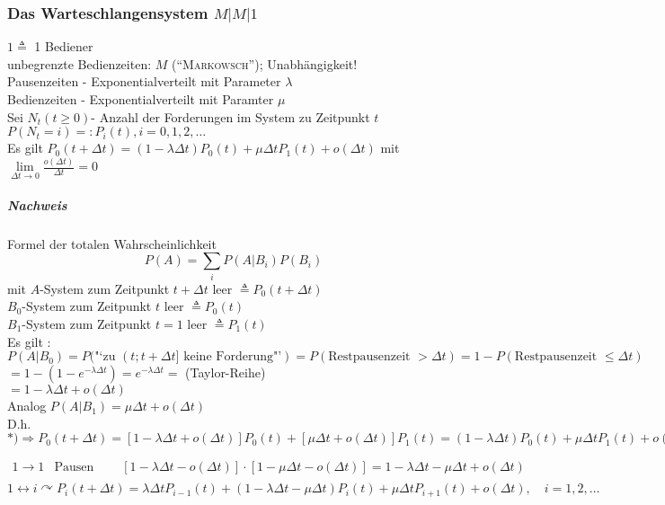 \documentclass[a4paper]{scrartcl}
\begin{document}
\subsubsection{Das Warteschlangensystem $M|M|1$}
$1 \triangleq$ 1 Bediener\\
unbegrenzte Bedienzeiten: $M$ ("`\textsc{Markowsch}"'); Unabhängigkeit!\\
Pausenzeiten - Exponentialverteilt mit Parameter $\lambda$\\
Bedienzeiten - Exponentialverteilt mit Paramter $\mu$\\
Sei $N_t (t \geq 0)$- Anzahl der Forderungen im System zu Zeitpunkt $t$\\
$P(N_t = i) =: P_i(t), i=0,1,2,\dots$\\
Es gilt $P_0 (t + \Delta t) = (1- \lambda \Delta t) P_0(t) + \mu \Delta t P_1(t) + o(\Delta t)$ mit $\lim\limits_{\Delta t \to 0} \frac{o(\Delta t)}{\Delta t} = 0$

\subparagraph{Nachweis} Formel der totalen Wahrscheinlichkeit
\[ P(A) = \sum\limits_i P(A | B_i ) P(B_i)\]
mit $A$-System zum Zeitpunkt $t+ \Delta t$ leer $\triangleq P_0(t+ \Delta t)$\\
$B_0$-System zum Zeitpunkt $t$ leer $\triangleq P_0(t)$\\
$B_1$-System zum Zeitpunkt $t=1$ leer $\triangleq P_1(t)$\\
Es gilt : $P(A | B_0) = P(\text{"`zu } (t; t+ \Delta t] \text{ keine Forderung"'}) = P(\text{Restpausenzeit } > \Delta t) = 1-P(\text{Restpausenzeit } \leq \Delta t)$\\
$= 1-(1-e^{-\lambda \Delta t} ) = e^{-\lambda \Delta t} =$ (Taylor-Reihe)\\
$= 1- \lambda \Delta t + o(\Delta t)$\\
Analog $P(A | B_1) = \mu \Delta t + o(\Delta t)$\\
D.h. $*) \Rightarrow P_0(t + \Delta t) = [ 1-\lambda \Delta t + o(\Delta t)] P_0(t) + [\mu \Delta t + o(\Delta t)] P_1(t) = (1-\lambda \Delta t) P_0(t) +  \mu \Delta t P_1(t) + o(\Delta t)$


$\begin{array}{c|c|c}
1 \rightarrow 1 & \text{Pausen und Bedienzeit laufen nicht ab} & [ 1 - \lambda \Delta t - o(\Delta t) ] \cdot [ 1- \mu \Delta t - o (\Delta t) ] = 1 - \lambda \Delta t - \mu \Delta t + o (\Delta t)\\
\end{array}$\\
$1 \leftrightarrow i \curvearrowright P_i (t + \Delta t) = \lambda \Delta t P_{i-1} (t ) + (1- \lambda \Delta t - \mu \Delta t) P_i (t) + \mu \Delta t P_{i+1} (t) + o(\Delta t), \quad i = 1,2,\dots$
\end{document}
